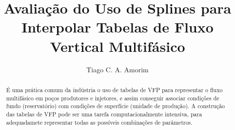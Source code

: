 \documentclass[final,5p]{elsarticle}
\numberwithin{equation}{section}
\begin{document}
\begin{frontmatter}



\title{Avaliação do Uso de Splines para Interpolar Tabelas de Fluxo Vertical Multifásico}


\author{Tiago C. A. Amorim}

\begin{abstract}

    É uma prática comum da indústria o uso de tabelas de VFP para representar o fluxo multifásico em poços produtores e injetores, e assim conseguir associar condições de fundo (reservatório) com condições de superfície (unidade de produção). A construção das tabelas de VFP pode ser uma tarefa computacionalmente intensiva, para adequadamete representar todas as possíveis combinações de parâmetros.


\end{abstract}
\end{frontmatter}
\end{document}
